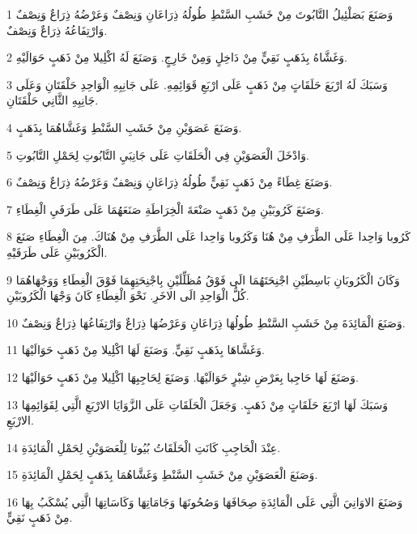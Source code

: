 \par 1 وَصَنَعَ بَصَلْئِيلُ التَّابُوتَ مِنْ خَشَبِ السَّنْطِ طُولُهُ ذِرَاعَانِ وَنِصْفٌ وَعَرْضُهُ ذِرَاعٌ وَنِصْفٌ وَارْتِفَاعُهُ ذِرَاعٌ وَنِصْفٌ.
\par 2 وَغَشَّاهُ بِذَهَبٍ نَقِيٍّ مِنْ دَاخِلٍ وَمِنْ خَارِجٍ. وَصَنَعَ لَهُ اكْلِيلا مِنْ ذَهَبٍ حَوَالَيْهِ.
\par 3 وَسَبَكَ لَهُ ارْبَعَ حَلَقَاتٍ مِنْ ذَهَبٍ عَلَى ارْبَعِ قَوَائِمِهِ. عَلَى جَانِبِهِ الْوَاحِدِ حَلْقَتَانِ وَعَلَى جَانِبِهِ الثَّانِي حَلْقَتَانِ.
\par 4 وَصَنَعَ عَصَوَيْنِ مِنْ خَشَبِ السَّنْطِ وَغَشَّاهُمَا بِذَهَبٍ.
\par 5 وَادْخَلَ الْعَصَوَيْنِ فِي الْحَلَقَاتِ عَلَى جَانِبَيِ التَّابُوتِ لِحَمْلِ التَّابُوتِ.
\par 6 وَصَنَعَ غِطَاءً مِنْ ذَهَبٍ نَقِيٍّ طُولُهُ ذِرَاعَانِ وَنِصْفٌ وَعَرْضُهُ ذِرَاعٌ وَنِصْفٌ.
\par 7 وَصَنَعَ كَرُوبَيْنِ مِنْ ذَهَبٍ صَنْعَةَ الْخِرَاطَةِ صَنَعَهُمَا عَلَى طَرَفَيِ الْغِطَاءِ.
\par 8 كَرُوبا وَاحِدا عَلَى الطَّرَفِ مِنْ هُنَا وَكَرُوبا وَاحِدا عَلَى الطَّرَفِ مِنْ هُنَاكَ. مِنَ الْغِطَاءِ صَنَعَ الْكَرُوبَيْنِ عَلَى طَرَفَيْهِ.
\par 9 وَكَانَ الْكَرُوبَانِ بَاسِطَيْنِ اجْنِحَتَهُمَا الَى فَوْقُ مُظَلِّلَيْنِ بِاجْنِحَتِهِمَا فَوْقَ الْغِطَاءِ وَوَجْهَاهُمَا كُلُّ الْوَاحِدِ الَى الاخَرِ. نَحْوَ الْغِطَاءِ كَانَ وَجْهَا الْكَرُوبَيْنِ.
\par 10 وَصَنَعَ الْمَائِدَةَ مِنْ خَشَبِ السَّنْطِ طُولُهَا ذِرَاعَانِ وَعَرْضُهَا ذِرَاعٌ وَارْتِفَاعُهَا ذِرَاعٌ وَنِصْفٌ.
\par 11 وَغَشَّاهَا بِذَهَبٍ نَقِيٍّ. وَصَنَعَ لَهَا اكْلِيلا مِنْ ذَهَبٍ حَوَالَيْهَا.
\par 12 وَصَنَعَ لَهَا حَاجِبا بِعَرْضِ شِبْرٍ حَوَالَيْهَا. وَصَنَعَ لِحَاجِبِهَا اكْلِيلا مِنْ ذَهَبٍ حَوَالَيْهَا.
\par 13 وَسَبَكَ لَهَا ارْبَعَ حَلَقَاتٍ مِنْ ذَهَبٍ. وَجَعَلَ الْحَلَقَاتِ عَلَى الزَّوَايَا الارْبَعِ الَّتِي لِقَوَائِمِهَا الارْبَعِ.
\par 14 عِنْدَ الْحَاجِبِ كَانَتِ الْحَلَقَاتُ بُيُوتا لِلْعَصَوَيْنِ لِحَمْلِ الْمَائِدَةِ.
\par 15 وَصَنَعَ الْعَصَوَيْنِ مِنْ خَشَبِ السَّنْطِ وَغَشَّاهُمَا بِذَهَبٍ لِحَمْلِ الْمَائِدَةِ.
\par 16 وَصَنَعَ الاوَانِيَ الَّتِي عَلَى الْمَائِدَةِ صِحَافَهَا وَصُحُونَهَا وَجَامَاتِهَا وَكَاسَاتِهَا الَّتِي يُسْكَبُ بِهَا مِنْ ذَهَبٍ نَقِيٍّ.
